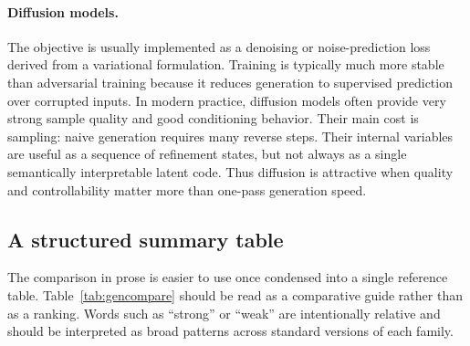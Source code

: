 \paragraph{Diffusion models.}
The objective is usually implemented as a denoising or noise-prediction loss derived from a variational formulation.
Training is typically much more stable than adversarial training because it reduces generation to supervised prediction over corrupted inputs.
In modern practice, diffusion models often provide very strong sample quality and good conditioning behavior.
Their main cost is sampling: naive generation requires many reverse steps.
Their internal variables are useful as a sequence of refinement states, but not always as a single semantically interpretable latent code.
Thus diffusion is attractive when quality and controllability matter more than one-pass generation speed.

\subsection*{A structured summary table}

The comparison in prose is easier to use once condensed into a single reference table.
Table~\ref{tab:gencompare} should be read as a comparative guide rather than as a ranking.
Words such as ``strong'' or ``weak'' are intentionally relative and should be interpreted as broad patterns across standard versions of each family.

